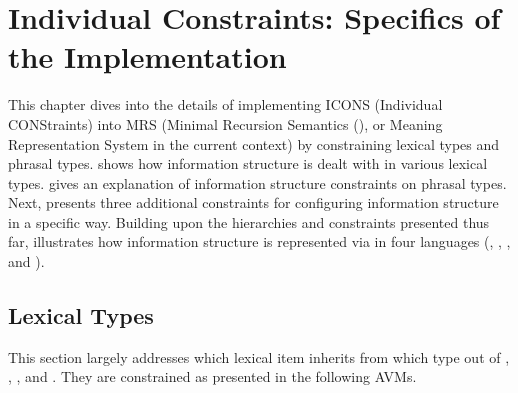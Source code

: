 \chapter{Individual Constraints: Specifics of the Implementation}
\label{chapter10}
\setcounter{enums}{0}


This chapter dives into the details of implementing ICONS (Individual
CONStraints) into MRS (Minimal Recursion
Semantics (\citealt{copestake:etal:05}), or Meaning
Representation System in the current context) by constraining lexical
types and phrasal types.  shows how information
structure is dealt with in various lexical types.
 gives an explanation of information structure
constraints on phrasal types. Next, 
presents three additional constraints for configuring information
structure in a specific way.  Building upon the hierarchies and
constraints presented thus far,  illustrates how
information structure is represented via  in four languages
(, , , and ).


\section{Lexical Types}
\label{10:sec:lexical}


This section largely addresses which lexical item inherits from which
 type out of ,
, , and
. They are constrained as presented in the
following AVMs.


